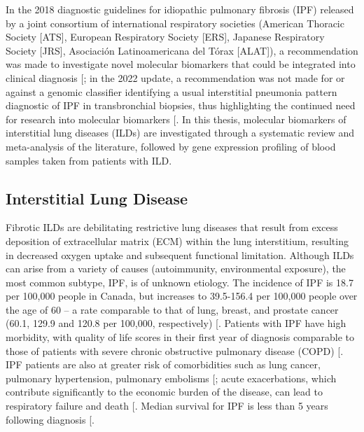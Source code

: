 \documentclass[
]{article}
\begin{document}
In the 2018 diagnostic guidelines for idiopathic pulmonary fibrosis (IPF) released by a joint consortium of international respiratory societies (American Thoracic Society {[}ATS{]}, European Respiratory Society {[}ERS{]}, Japanese Respiratory Society {[}JRS{]}, Asociación Latinoamericana del Tórax {[}ALAT{]}), a recommendation was made to investigate novel molecular biomarkers that could be integrated into clinical diagnosis {[}\citeproc{ref-raghu_diagnosis_2018}{1}{]}; in the 2022 update, a recommendation was not made for or against a genomic classifier identifying a usual interstitial pneumonia pattern diagnostic of IPF in transbronchial biopsies, thus highlighting the continued need for research into molecular biomarkers {[}\citeproc{ref-raghu_idiopathic_2022}{2}{]}. In this thesis, molecular biomarkers of interstitial lung diseases (ILDs) are investigated through a systematic review and meta-analysis of the literature, followed by gene expression profiling of blood samples taken from patients with ILD.

\subsection{Interstitial Lung Disease}\label{interstitial-lung-disease}

Fibrotic ILDs are debilitating restrictive lung diseases that result from excess deposition of extracellular matrix (ECM) within the lung interstitium, resulting in decreased oxygen uptake and subsequent functional limitation. Although ILDs can arise from a variety of causes (autoimmunity, environmental exposure), the most common subtype, IPF, is of unknown etiology. The incidence of IPF is 18.7 per 100,000 people in Canada, but increases to 39.5-156.4 per 100,000 people over the age of 60 -- a rate comparable to that of lung, breast, and prostate cancer (60.1, 129.9 and 120.8 per 100,000, respectively) {[}\citeproc{ref-canadian_cancer_statistics_advisory_committee_in_collaboration_with_the_canadian_cancer_society_statistics_canada_and_the_public_health_agency_of_canada_canadian_2023}{4}{]}. Patients with IPF have high morbidity, with quality of life scores in their first year of diagnosis comparable to those of patients with severe chronic obstructive pulmonary disease (COPD) {[}\citeproc{ref-hopkins_epidemiology_2016}{3}{]}. IPF patients are also at greater risk of comorbidities such as lung cancer, pulmonary hypertension, pulmonary embolisms {[}\citeproc{ref-raghu_comorbidities_2015}{5}{]}; acute exacerbations, which contribute significantly to the economic burden of the disease, can lead to respiratory failure and death {[}\citeproc{ref-hilberg_economic_2018}{7}{]}. Median survival for IPF is less than 5 years following diagnosis {[}\citeproc{ref-ley_clinical_2011}{8}{]}.
\end{document}
